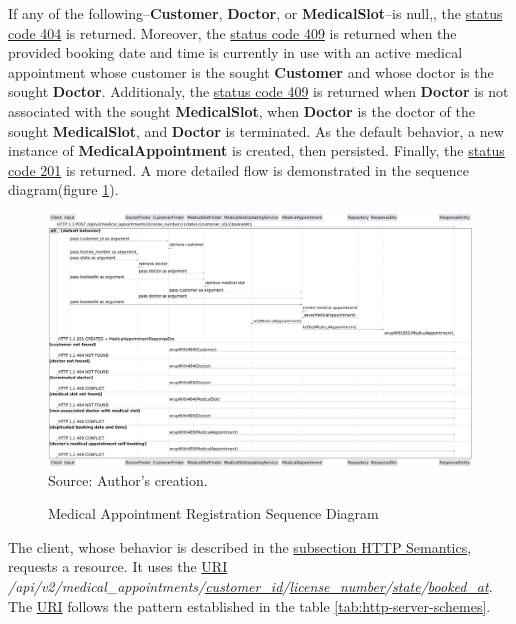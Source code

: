 If any of the following--\textbf{Customer}, \textbf{Doctor}, or \textbf{MedicalSlot}--is null,, the \hyperref[tab:summary_http_status_codes]{status code 404} is returned.
Moreover, the \hyperref[tab:summary_http_status_codes]{status code 409} is returned when the provided booking date and time is currently in use with an active medical appointment whose customer is the sought \textbf{Customer} and whose doctor is the sought \textbf{Doctor}. Additionaly,  the \hyperref[tab:summary_http_status_codes]{status code 409} is returned when \textbf{Doctor} is not associated with the sought \textbf{MedicalSlot}, when \textbf{Doctor} is the doctor of the sought \textbf{MedicalSlot}, and \textbf{Doctor} is terminated. As the default behavior, a new instance of \textbf{MedicalAppointment} is created, then persisted. Finally, the \hyperref[tab:summary_http_status_codes]{status code 201} is returned. A more detailed flow is demonstrated in the sequence diagram(figure \ref{fig:medical_appointment_registration_sequence_diagram}).

\begin{landscape}
	\begin{figure}[H]
		\centering
		\caption{Medical Appointment Registration Sequence Diagram}
		\includegraphics[width=0.99\linewidth]{figures/medical_appointment_registration_sequence_diagram}
		\\ \footnotesize Source: Author's creation.
		\label{fig:medical_appointment_registration_sequence_diagram}
	\end{figure}
\end{landscape}

The client, whose behavior is described in the \hyperref[subsection:http_semantics]{subsection HTTP Semantics}, requests a resource. It uses the \hyperref[appendix:glossary]{URI} \textit{/api/v2/medical\_appointments/\underline{customer\_id}/\underline{license\_number}/\underline{state}/\underline{booked\_at}}. The \hyperref[appendix:glossary]{URI} follows the pattern established  in the table \ref{tab:http-server-schemes}.


